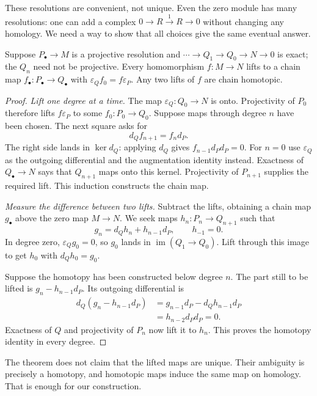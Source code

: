 These resolutions are convenient, not unique. Even the zero module has many resolutions: one can add a complex $0\to R\xrightarrow{1}R\to0$ without changing any homology. We need a way to show that all choices give the same eventual answer.

\begin{theorem}\label{thm:comparison}
Suppose $P_\bullet\to M$ is a projective resolution and
$\cdots\to Q_1\to Q_0\to N\to0$ is exact; the $Q_n$ need not be projective. Every homomorphism $f:M\to N$ lifts to a chain map $f_\bullet:P_\bullet\to Q_\bullet$ with
$\varepsilon_Qf_0=f\varepsilon_P$. Any two lifts of $f$ are chain homotopic.
\end{theorem}

\begin{proof}
\emph{Lift one degree at a time.} The map $\varepsilon_Q:Q_0\to N$ is onto. Projectivity of $P_0$ therefore lifts $f\varepsilon_P$ to some $f_0:P_0\to Q_0$.
Suppose maps through degree $n$ have been chosen. The next square asks for
\[
d_Qf_{n+1}=f_nd_P.
\]
The right side lands in $\ker d_Q$: applying $d_Q$ gives
$f_{n-1}d_Pd_P=0$. For $n=0$ use $\varepsilon_Q$ as the outgoing differential and the augmentation identity instead. Exactness of $Q_\bullet\to N$ says that $Q_{n+1}$ maps onto this kernel. Projectivity of $P_{n+1}$ supplies the required lift. This induction constructs the chain map.

\emph{Measure the difference between two lifts.} Subtract the lifts, obtaining a chain map $g_\bullet$ above the zero map $M\to N$. We seek maps $h_n:P_n\to Q_{n+1}$ such that
\[
g_n=d_Qh_n+h_{n-1}d_P,\qquad h_{-1}=0.
\]
In degree zero, $\varepsilon_Qg_0=0$, so $g_0$ lands in $\operatorname{im}(Q_1\to Q_0)$. Lift through this image to get $h_0$ with $d_Qh_0=g_0$.

Suppose the homotopy has been constructed below degree $n$. The part still to be lifted is $g_n-h_{n-1}d_P$. Its outgoing differential is
\[
\begin{aligned}
d_Q(g_n-h_{n-1}d_P)
 &=g_{n-1}d_P-d_Qh_{n-1}d_P\\
 &=h_{n-2}d_Pd_P=0.
\end{aligned}
\]
Exactness of $Q$ and projectivity of $P_n$ now lift it to $h_n$. This proves the homotopy identity in every degree.
\end{proof}

The theorem does not claim that the lifted maps are unique. Their ambiguity is precisely a homotopy, and homotopic maps induce the same map on homology. That is enough for our construction.

